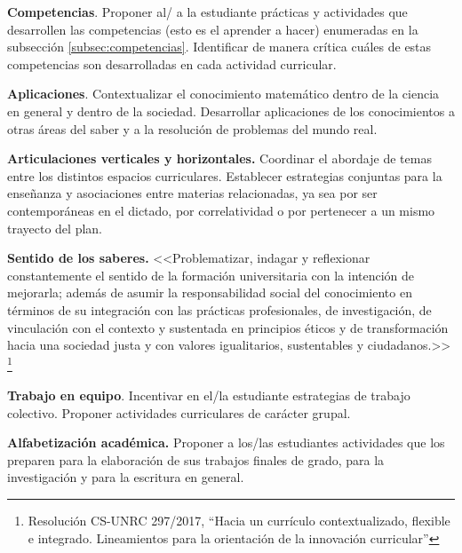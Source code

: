 \documentclass[a4paper, 12pt]{article}
\begin{document}
\begin{description}
  



\item{\textbf{Competencias}.} Proponer al/ a la estudiante prácticas y actividades que desarrollen las competencias (esto es el aprender a hacer) enumeradas en la subsección \ref{subsec:competencias}. Identificar de manera crítica cuáles de estas competencias son desarrolladas en cada actividad curricular.


\item{\textbf{Aplicaciones}.}  Contextualizar el conocimiento matemático dentro de la ciencia en general y dentro de la sociedad. Desarrollar aplicaciones de los conocimientos a otras áreas del saber y a la resolución de problemas del mundo real. 



\item{\textbf{Articulaciones verticales y horizontales.}} Coordinar el abordaje de  temas entre los distintos espacios curriculares. Establecer estrategias conjuntas para la enseñanza y asociaciones entre materias relacionadas, ya sea por ser contemporáneas en el dictado, por correlatividad o por pertenecer a un mismo trayecto del plan. 


\item{ \textbf{Sentido de los saberes.}} <<Problematizar, indagar y reflexionar constantemente el sentido de la formación
universitaria con la intención de mejorarla; además de asumir la responsabilidad social del
conocimiento en términos de su integración con las prácticas profesionales, de investigación, de
vinculación con el contexto y sustentada en principios éticos y de transformación hacia una
sociedad justa y con valores igualitarios, sustentables y ciudadanos.>> \footnote{Resolución CS-UNRC 297/2017, ``Hacia   un   currículo contextualizado, flexible e integrado. Lineamientos para la orientación de la innovación  curricular''}

\item{\textbf{Trabajo en equipo}.} Incentivar en el/la estudiante estrategias de trabajo colectivo. Proponer actividades curriculares   de carácter  grupal.



\item{ \textbf{Alfabetización académica.}} Proponer a los/las estudiantes actividades que los preparen para la
elaboración de sus trabajos finales de grado, para la investigación y para la escritura en general. 





\end{description}
\end{document}
